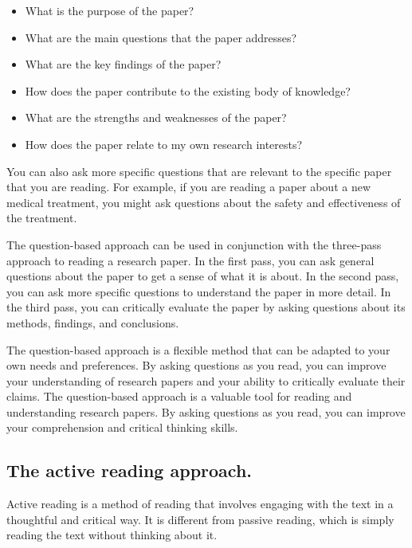 \documentclass[
  b5paper]{book}
\begin{document}
\begin{itemize}
\item
  What is the purpose of the paper?
\item
  What are the main questions that the paper addresses?
\item
  What are the key findings of the paper?
\item
  How does the paper contribute to the existing body of knowledge?
\item
  What are the strengths and weaknesses of the paper?
\item
  How does the paper relate to my own research interests?
\end{itemize}

You can also ask more specific questions that are relevant to the specific paper that you are reading. For example, if you are reading a paper about a new medical treatment, you might ask questions about the safety and effectiveness of the treatment.

The question-based approach can be used in conjunction with the three-pass approach to reading a research paper. In the first pass, you can ask general questions about the paper to get a sense of what it is about. In the second pass, you can ask more specific questions to understand the paper in more detail. In the third pass, you can critically evaluate the paper by asking questions about its methods, findings, and conclusions.

The question-based approach is a flexible method that can be adapted to your own needs and preferences. By asking questions as you read, you can improve your understanding of research papers and your ability to critically evaluate their claims. The question-based approach is a valuable tool for reading and understanding research papers. By asking questions as you read, you can improve your comprehension and critical thinking skills.

\hypertarget{the-active-reading-approach.}{%
\subsection*{The active reading approach.}\label{the-active-reading-approach.}}

Active reading is a method of reading that involves engaging with the text in a thoughtful and critical way. It is different from passive reading, which is simply reading the text without thinking about it.
\end{document}
